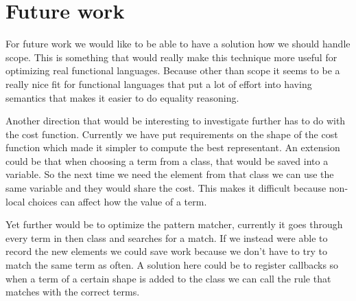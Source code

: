 
\section{Future work}
For future work we would like to be able to have a solution how we should handle
scope. This is something that would really make this technique more useful for
optimizing real functional languages. Because other than scope it seems to be a 
really nice fit for functional languages that put a lot of effort into having semantics
that makes it easier to do equality reasoning.

Another direction that would be interesting to investigate further has to do with
the cost function. Currently we have put requirements on the shape of the cost function
which made it simpler to compute the best representant. An extension could be that
when choosing a term from a class, that would be saved into a variable. So the next
time we need the element from that class we can use the same variable and they would
share the cost. This makes it difficult because non-local choices can affect how
the value of a term.

Yet further would be to optimize the pattern matcher, currently it goes through 
every term in then class and searches for a match. If we instead were able to 
record the new elements we could save work because we don't have to try to match
the same term as often. A solution here could be to register callbacks so when a
term of a certain shape is added to the class we can call the rule that matches with
the correct terms.

 



